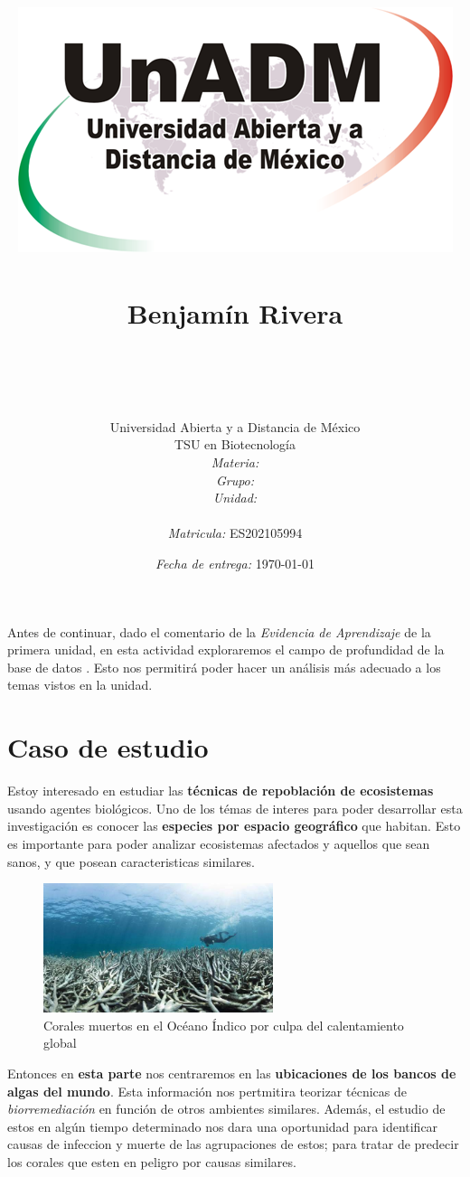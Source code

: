 \documentclass[12pt]{article}
\title{
	\includegraphics{../../../assets/logo-unadm} \\
	\ \\ Benjam\'in Rivera \\
	\bf{\titulo}\\\ \\}
\author{
	Universidad Abierta y a Distancia de México \\
	TSU en Biotecnolog\'ia \\
	\textit{Materia:} \materia \\
	\textit{Grupo:} \grupo \\
	\textit{Unidad:} \unidad \\
	\\
	\textit{Matricula:} ES202105994 }
\date{\textit{Fecha de entrega:} \today}
\begin{document}
\maketitle\newpage

	\par Antes de continuar, dado el comentario de la \textit{ Evidencia de Aprendizaje } de la primera unidad, en esta actividad exploraremos el campo de profundidad de la base de datos \cite{db}. Esto nos permitirá poder hacer un análisis más adecuado a los temas vistos en la unidad.


\section{Caso de estudio}


	\par Estoy interesado en estudiar las \textbf{t\'ecnicas de repoblaci\'on de ecosistemas} usando agentes biol\'ogicos. Uno de los t\'emas de interes para poder desarrollar esta investigaci\'on es conocer las \textbf{especies por espacio geogr\'afico} que habitan. Esto es importante para poder analizar ecosistemas afectados y aquellos que sean sanos, y que posean caracteristicas similares. 

	\begin{figure}[h]
		\centering
			\includegraphics[width=0.6\textwidth]{coral-muerto.jpg}
		\caption{Corales muertos en el Océano Índico por culpa del calentamiento global \cite{corales muertos}}
		\label{fig: corales muertos}
	\end{figure}
	

	\par Entonces en \textbf{esta parte} nos centraremos en las \textbf{ubicaciones de los bancos de algas del mundo}. Esta informaci\'on nos pertmitira teorizar t\'ecnicas de \textit{biorremediaci\'on} en funci\'on de otros ambientes similares. Adem\'as, el estudio de estos en alg\'un tiempo determinado nos dara una oportunidad para identificar causas de infeccion y muerte de las agrupaciones de estos; para tratar de predecir los corales que esten en peligro por causas similares.
	
\end{document}
